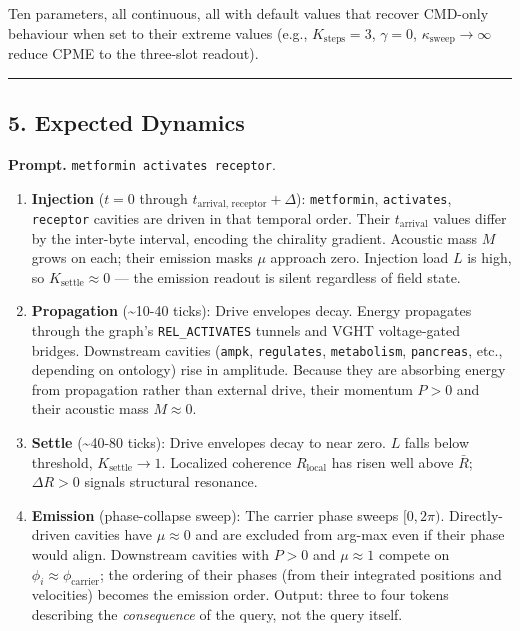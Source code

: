 \documentclass[
  11pt,
  a4paper,
]{article}
\providecommand{\tightlist}{%
  \setlength{\itemsep}{0pt}\setlength{\parskip}{0pt}}
\begin{document}
Ten parameters, all continuous, all with default values that recover
CMD-only behaviour when set to their extreme values (e.g.,
\(K_{\text{steps}} = 3\), \(\gamma = 0\),
\(\kappa_{\text{sweep}} \to \infty\) reduce CPME to the three-slot
readout).

\begin{center}\rule{0.5\linewidth}{0.5pt}\end{center}

\subsection{5. Expected Dynamics}\label{expected-dynamics}

\textbf{Prompt.} \texttt{metformin\ activates\ receptor}.

\begin{enumerate}
\def\labelenumi{\arabic{enumi}.}
\tightlist
\item
  \textbf{Injection} (\(t = 0\) through
  \(t_{\text{arrival, receptor}} + \Delta\)): \texttt{metformin},
  \texttt{activates}, \texttt{receptor} cavities are driven in that
  temporal order. Their \(t_{\text{arrival}}\) values differ by the
  inter-byte interval, encoding the chirality gradient. Acoustic mass
  \(M\) grows on each; their emission masks \(\mu\) approach zero.
  Injection load \(L\) is high, so \(K_{\text{settle}} \approx 0\) ---
  the emission readout is silent regardless of field state.
\item
  \textbf{Propagation} (\textasciitilde10-40 ticks): Drive envelopes
  decay. Energy propagates through the graph's \texttt{REL\_ACTIVATES}
  tunnels and VGHT voltage-gated bridges. Downstream cavities
  (\texttt{ampk}, \texttt{regulates}, \texttt{metabolism},
  \texttt{pancreas}, etc., depending on ontology) rise in amplitude.
  Because they are absorbing energy from propagation rather than
  external drive, their momentum \(P > 0\) and their acoustic mass
  \(M \approx 0\).
\item
  \textbf{Settle} (\textasciitilde40-80 ticks): Drive envelopes decay to
  near zero. \(L\) falls below threshold, \(K_{\text{settle}} \to 1\).
  Localized coherence \(R_{\text{local}}\) has risen well above
  \(\bar R\); \(\Delta R > 0\) signals structural resonance.
\item
  \textbf{Emission} (phase-collapse sweep): The carrier phase sweeps
  \([0, 2\pi)\). Directly-driven cavities have \(\mu \approx 0\) and are
  excluded from arg-max even if their phase would align. Downstream
  cavities with \(P > 0\) and \(\mu \approx 1\) compete on
  \(\phi_i \approx \phi_{\text{carrier}}\); the ordering of their phases
  (from their integrated positions and velocities) becomes the emission
  order. Output: three to four tokens describing the \emph{consequence}
  of the query, not the query itself.
\end{enumerate}
\end{document}
